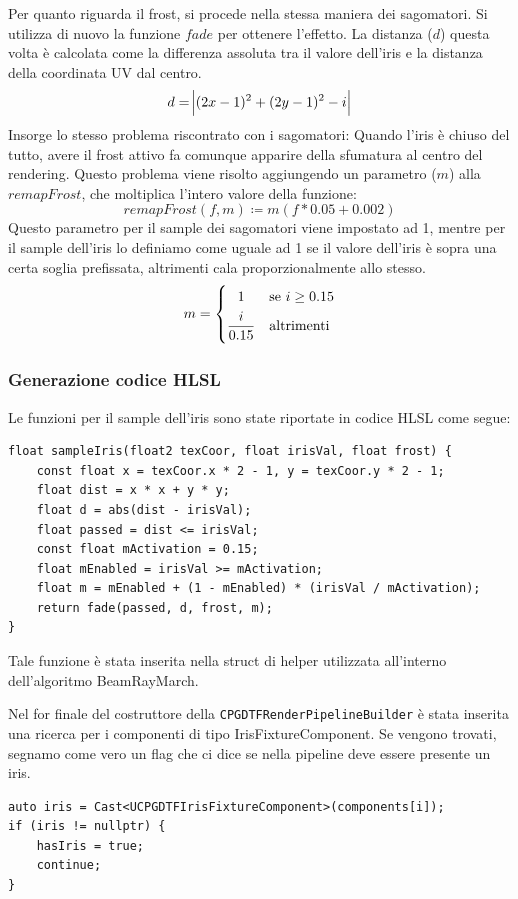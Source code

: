 \documentclass[main.tex]{subfiles}
\begin{document}
Per quanto riguarda il frost, si procede nella stessa maniera dei sagomatori. Si utilizza di nuovo la funzione $fade$ per ottenere l'effetto. La distanza ($d$) questa volta è calcolata come la differenza assoluta tra il valore dell'iris e la distanza della coordinata UV dal centro.
\[d = \abs{(2x - 1)^2 + (2y - 1)^2 - i}\]
Insorge lo stesso problema riscontrato con i sagomatori: Quando l'iris è chiuso del tutto, avere il frost attivo fa comunque apparire della sfumatura al centro del rendering. Questo problema viene risolto aggiungendo un parametro ($m$) alla $remapFrost$, che moltiplica l'intero valore della funzione:
\[remapFrost(f, m) \coloneqq m(f * 0.05 + 0.002)\]
Questo parametro per il sample dei sagomatori viene impostato ad 1, mentre per il sample dell'iris lo definiamo come uguale ad 1 se il valore dell'iris è sopra una certa soglia prefissata, altrimenti cala proporzionalmente allo stesso.
\[m = 
    \begin{dcases}
        \hfil 1 & \text{se } i \geq 0.15\\
        \frac{i}{0.15} & \text{altrimenti}
    \end{dcases}
\]

\subsubsection{Generazione codice HLSL}\label{subsec:5_2_IrisHlsl}
Le funzioni per il sample dell'iris sono state riportate in codice HLSL come segue:
\lstset{language=glsl}
\begin{lstlisting}
float sampleIris(float2 texCoor, float irisVal, float frost) {
    const float x = texCoor.x * 2 - 1, y = texCoor.y * 2 - 1;
    float dist = x * x + y * y;
    float d = abs(dist - irisVal);
    float passed = dist <= irisVal;
    const float mActivation = 0.15;
    float mEnabled = irisVal >= mActivation;
    float m = mEnabled + (1 - mEnabled) * (irisVal / mActivation);
    return fade(passed, d, frost, m);
}
\end{lstlisting}
Tale funzione è stata inserita nella struct di helper utilizzata all'interno dell'algoritmo BeamRayMarch. \newline

Nel for finale del costruttore della \lstinline{CPGDTFRenderPipelineBuilder} è stata inserita una ricerca per i componenti di tipo IrisFixtureComponent. Se vengono trovati, segnamo come vero un flag che ci dice se nella pipeline deve essere presente un iris.
\lstset{language=UEcpp}
\begin{lstlisting}
auto iris = Cast<UCPGDTFIrisFixtureComponent>(components[i]);
if (iris != nullptr) {
    hasIris = true;
    continue;
}
\end{lstlisting}
\end{document}
